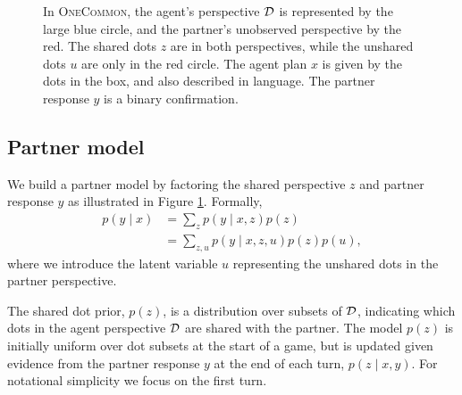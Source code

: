 \documentclass[11pt]{article}
\begin{document}
\begin{figure}
{\begin{tikzpicture}

\end{tikzpicture}
}
\caption{In \textsc{OneCommon},
the agent's perspective $\mcD$ is represented by the large blue circle,
and the partner's unobserved perspective by the red.
The shared dots $z$ are in both perspectives,
while the unshared dots $u$ are only in the red circle. 
The agent plan $x$ is given by the dots in the box,
and also described in language.
The partner response $y$ is a binary confirmation.
}
\label{fig:xzy}
\end{figure}

\subsection{Partner model}


We build a partner model by factoring the shared perspective $z$ and partner response $y$ as illustrated in Figure \ref{fig:xzy}. 
Formally,
\begin{align*}
p(y \mid x) &= \sum_z p(y\mid x,z)p(z) \\
&= \sum_{z,u}  p(y \mid x, z, u)p(z)p(u),
\end{align*}
where we introduce the latent variable $u$ representing the unshared dots in the partner perspective.

The shared dot prior, $p(z)$, is a distribution over subsets of $\mcD$, indicating which dots in the agent perspective $\mcD$ are shared with the partner.
The model $p(z)$ is initially uniform over dot subsets at the start of a game,
but is updated given evidence from the partner response $y$ at the end of each turn, $p(z \mid x, y)$. For notational simplicity we focus on the first turn.
\end{document}
